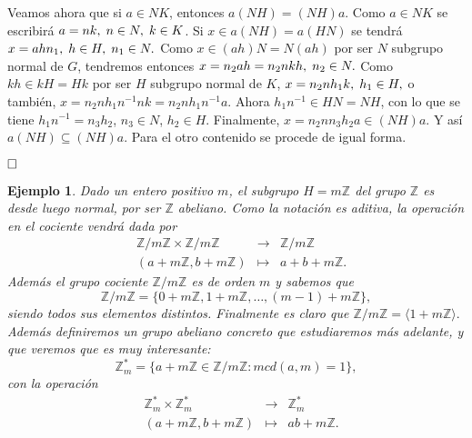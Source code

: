 \documentclass[12pt]{article}
\newtheorem{example}{Ejemplo}[theorem]
\begin{document}
Veamos ahora que si $a \in NK$, entonces $a(NH) = (NH)a$. Como $a \in NK$ se escribirá $a = nk, \hspace{0.1cm} n \in N, \hspace{0.1cm} k \in K$. Si $x \in a(NH) = a(HN)$ se tendrá $x = ahn_{1}, \hspace{0.1cm} h \in H, \hspace{0.1cm} n_{1} \in N.$ Como $x \in (ah)N = N(ah)$ por ser $N$ subgrupo normal de $G$, tendremos entonces $x = n_{2}ah = n_{2}nkh, \hspace{0.1cm} n_{2} \in N.$ Como $kh \in kH = Hk$ por ser $H$ subgrupo normal de $K$, $x = n_{2}nh_{1}k, \hspace{0.1cm} h_{1} \in H,$ o también, $x = n_{2}nh_{1}n^{-1}nk = n_{2}nh_{1}n^{-1}a$. Ahora $h_{1}n^{-1} \in HN = NH$, con lo que se tiene $h_{1}n^{-1} = n_{3}h_{2}$, $n_{3} \in N$, $h_{2} \in H$. Finalmente, $x = n_{2}nn_{3}h_{2}a \in (NH)a$. Y así $a(NH) \subseteq (NH)a$. Para el otro contenido se procede de igual forma.

$\hfill \square$

\begin{example}
Dado un entero positivo $m$, el subgrupo $H = m\mathbb{Z}$ del grupo $\mathbb{Z}$ es desde luego normal, por ser $\mathbb{Z}$ abeliano. Como la notación es aditiva, la operación en el cociente vendrá dada por $$\begin{array}{rccl}
&\mathbb{Z}/m\mathbb{Z} \times \mathbb{Z}/m\mathbb{Z} & \longrightarrow & \mathbb{Z}/m\mathbb{Z}\\
&(a+m\mathbb{Z}, b+m\mathbb{Z}) & \longmapsto &a+b+m\mathbb{Z}.
\end{array}
$$
Además el grupo cociente $\mathbb{Z}/m\mathbb{Z}$ es de orden $m$ y sabemos que $$\mathbb{Z}/m\mathbb{Z} = \lbrace 0+m\mathbb{Z}, 1+m\mathbb{Z}, \ldots, (m-1)+m\mathbb{Z}\rbrace,$$ siendo todos sus elementos distintos. Finalmente es claro que $\mathbb{Z}/m\mathbb{Z} = \langle 1+m\mathbb{Z}\rangle.$ Además definiremos un grupo abeliano concreto que estudiaremos más adelante, y que veremos que es muy interesante:
$$\mathbb{Z}_{m}^{\ast} = \lbrace a+m\mathbb{Z} \in \mathbb{Z}/m\mathbb{Z} : mcd(a,m) = 1\rbrace,$$
con la operación 
$$\begin{array}{rccl}
&\mathbb{Z}_{m}^{\ast} \times \mathbb{Z}_{m}^{\ast} & \longrightarrow & \mathbb{Z}_{m}^{\ast}\\
&(a+m\mathbb{Z}, b+m\mathbb{Z}) & \longmapsto &ab+m\mathbb{Z}.
\end{array}
$$
\end{example}
\end{document}
